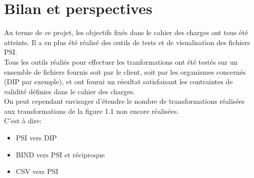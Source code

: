 \chapter{Bilan et perspectives }

Au terme de ce projet, les objectifs fix\'es dans le cahier des charges
ont tous \'et\'e atteints. Il a en plus \'et\'e r\'ealis\'e des outils de
tests et de visualisation des fichiers PSI.\\ Tous les outils
r\'eali\'es pour effectuer les tranformations ont \'et\'e test\'es sur
un ensemble de fichiers fournis soit par le client, soit par les
organismes concern\'es (DIP par exemple), et ont fourni un r\'esultat
satisfaisant les contraintes de validit\'e d\'efinies dans le cahier des
charges.\\
On peut cependant envisager d'\'etendre le nombre de transformations
r\'ealis\'ees aux transformations de la figure 1.1 non encore
r\'ealis\'ees. \\
C'est \`a dire:\\
\begin{itemize}
\item PSI vers DIP\\
\item BIND vers PSI et r\'eciproque\\
\item CSV vers PSI\\
\end{itemize}